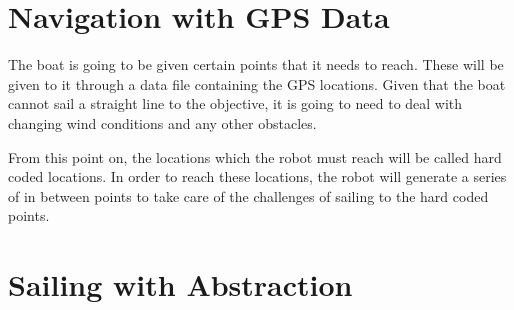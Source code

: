\documentclass[letterpaper]{article}
\begin{document}
%

\section{Navigation with GPS Data} %
\label{sec:Navigation with GPS Data}

The boat is going to be given certain points that it needs to reach.
These will be given to it through a data file containing the GPS
locations. Given that the boat cannot sail a straight line to the
objective, it is going to need to deal with changing wind conditions and
any other obstacles.

From this point on, the locations which the robot must reach will be called
hard coded locations. In order to reach these locations, the robot will generate
a series of in between points to take care of the challenges of sailing to the
hard coded points.


\section{Sailing with Abstraction} %
\label{sec:Sailing with Abstraction}

\end{document}
